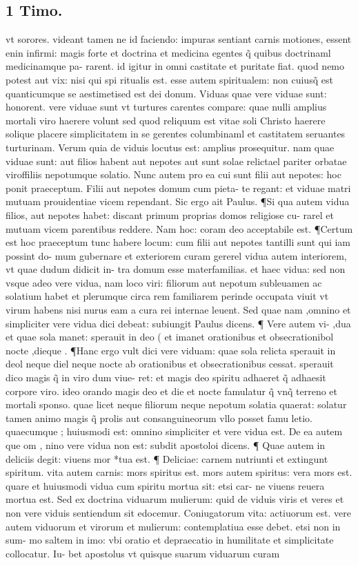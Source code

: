\documentclass{article}
\begin{document}
\begin{pages}
\section*{1 Timo. }
\marginpar{[ p.209 ]}\pstart vt sorores. videant tamen ne id faciendo: impuras sentiant carnis motiones, essent enin infirmi: magis forte et doctrina et medicina egentes q̃ quibus doctrinaml medicinamque pa- rarent. id igitur in omni castitate et puritate fiat. quod nemo potest aut vix: nisi qui spi ritualis est. esse autem spiritualem: non cuiusq̃ est quanticumque se aestimetised est dei donum. Viduas quae vere viduae sunt: honorent. vere viduae sunt vt turtures carentes compare: quae nulli amplius mortali viro haerere volunt sed quod reliquum est vitae soli Christo haerere solique  placere simplicitatem in se gerentes columbinaml et castitatem seruantes turturinam. Verum quia de viduis locutus est: amplius prosequitur. nam quae viduae sunt: aut filios habent aut nepotes aut sunt solae relictael pariter orbatae viroffiliis nepotumque solatio. Nunc autem pro ea cui sunt filii aut nepotes: hoc ponit praeceptum. Filii aut nepotes domum cum pieta- te regant: et viduae matri mutuam prouidentiae vicem rependant. Sic ergo ait Paulus. ¶Si qua autem vidua filios, aut nepotes habet: discant primum proprias domos religiose cu- rarel et mutuam vicem parentibus reddere. Nam hoc: coram deo acceptabile est. ¶Certum est hoc praeceptum tunc habere locum: cum filii aut nepotes tantilli sunt qui iam possint do- mum gubernare et exteriorem curam gererel vidua autem interiorem, vt quae dudum didicit in- tra domum esse materfamilias. et haec vidua: sed non vsque adeo vere vidua, nam loco viri: filiorum aut nepotum subleuamen ac solatium habet et plerumque circa rem familiarem perinde occupata viuit vt virum habens nisi nurus eam a cura rei internae leuent. Sed quae nam ,omnino et simpliciter vere vidua dici debeat: subiungit Paulus dicens. ¶ Vere autem vi- ,dua et quae sola manet: sperauit in deo ( et imanet orationibus et obsecrationibol nocte ,dieque . ¶Hanc ergo vult dici vere viduam: quae sola relicta sperauit in deol neque diel neque  nocte ab orationibus et obsecrationibus cessat. sperauit dico magis q̃ in viro dum viue- ret: et magis deo spiritu adhaeret q̃ adhaesit corpore viro. ideo orando magis deo et die et nocte famulatur q̃ vnq̃ terreno et mortali sponso. quae licet neque filiorum neque nepotum solatia quaerat: solatur tamen animo magis q̃ prolis aut consanguineorum vllo posset famu letio. quaecumque ; huiusmodi est: omnino simpliciter et vere vidua est. De ea autem que om , nino vere vidua non est: subdit apostoloi dicens. ¶ Quae autem in deliciis degit: viuens mor *tua est. ¶ Deliciae: carnem nutriunti et extingunt spiritum. vita autem carnis: mors spiritus est. mors autem spiritus: vera mors est. quare et huiusmodi vidua cum spiritu mortua sit: etsi car- ne viuens reuera mortua est. Sed ex doctrina viduarum mulierum: quid de viduis viris et veres et non vere viduis sentiendum sit edocemur. Coniugatorum vita: actiuorum est. vere autem viduorum et virorum et mulierum: contemplatiua esse debet. etsi non in sum- mo saltem in imo: vbi oratio et depraecatio in humilitate et simplicitate collocatur. Iu- bet apostolus vt quisque suarum viduarum curam 
\end{pages}
\end{document}
